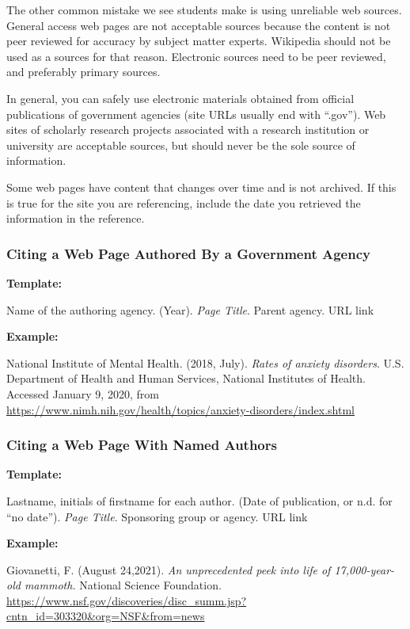 \documentclass[
]{book}
\begin{document}
The other common mistake we see students make is using unreliable web sources. General access web pages are not acceptable sources because the content is not peer reviewed for accuracy by subject matter experts. Wikipedia should not be used as a sources for that reason. Electronic sources need to be peer reviewed, and preferably primary sources.

In general, you can safely use electronic materials obtained from official publications of government agencies (site URLs usually end with ``.gov''). Web sites of scholarly research projects associated with a research institution or university are acceptable sources, but should never be the sole source of information.

Some web pages have content that changes over time and is not archived. If this is true for the site you are referencing, include the date you retrieved the information in the reference.

\hypertarget{citing-a-web-page-authored-by-a-government-agency}{%
\subsubsection{Citing a Web Page Authored By a Government Agency}\label{citing-a-web-page-authored-by-a-government-agency}}

\textbf{Template:}

Name of the authoring agency. (Year). \emph{Page Title}. Parent agency. URL link

\textbf{Example:}

National Institute of Mental Health. (2018, July). \emph{Rates of anxiety disorders}. U.S. Department of Health and Human Services, National Institutes of Health. Accessed January 9, 2020, from \url{https://www.nimh.nih.gov/health/topics/anxiety-disorders/index.shtml}

\hypertarget{citing-a-web-page-with-named-authors}{%
\subsubsection{Citing a Web Page With Named Authors}\label{citing-a-web-page-with-named-authors}}

\textbf{Template:}

Lastname, initials of firstname for each author. (Date of publication, or n.d. for ``no date''). \emph{Page Title}. Sponsoring group or agency. URL link

\textbf{Example:}

Giovanetti, F. (August 24,2021). \emph{An unprecedented peek into life of 17,000-year-old mammoth.} National Science Foundation. \url{https://www.nsf.gov/discoveries/disc_summ.jsp?cntn_id=303320\&org=NSF\&from=news}
\end{document}
